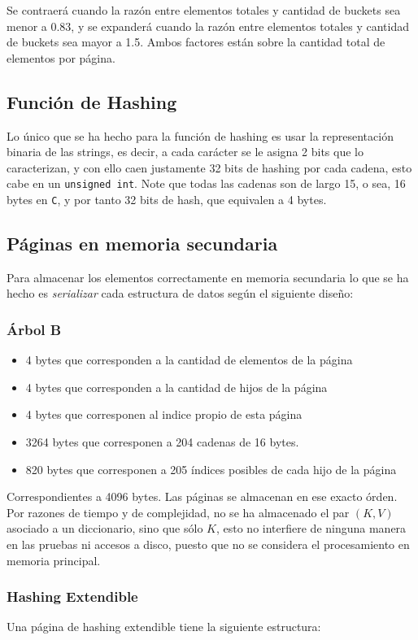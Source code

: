 \documentclass[12pt,letterpaper]{report}
\begin{document}
Se contraerá cuando la razón entre elementos totales y cantidad de buckets sea menor a 0.83, y se expanderá cuando la razón entre elementos totales y cantidad de buckets sea mayor a 1.5. Ambos factores están sobre la cantidad total de elementos por página.

\subsection{Función de Hashing}
Lo único que se ha hecho para la función de hashing es usar la representación binaria de las strings, es decir, a cada carácter se le asigna 2 bits que lo caracterizan, y con ello caen justamente 32 bits de hashing por cada cadena, esto cabe en un \texttt{unsigned int}. Note que todas las cadenas son de largo 15, o sea, 16 bytes en \texttt{C}, y por tanto 32 bits de hash, que equivalen a 4 bytes.

\subsection{Páginas en memoria secundaria}
Para almacenar los elementos correctamente en memoria secundaria lo que se ha hecho es \emph{serializar} cada estructura de datos según el siguiente diseño:

\subsubsection{Árbol B}
\begin{itemize}
\item 4 bytes que corresponden a la cantidad de elementos de la página
\item 4 bytes que corresponden a la cantidad de hijos de la página
\item 4 bytes que corresponen al indice propio de esta página
\item 3264 bytes que corresponen a 204 cadenas de 16 bytes.
\item 820 bytes que corresponen a 205 índices posibles de cada hijo de la página
\end{itemize}

Correspondientes a 4096 bytes. Las páginas se almacenan en ese exacto órden. Por razones de tiempo y de complejidad, no se ha almacenado el par $(K,V)$ asociado a un diccionario, sino que sólo $K$, esto no interfiere de ninguna manera en las pruebas ni accesos a disco, puesto que no se considera el procesamiento en memoria principal.

\subsubsection{Hashing Extendible}
Una página de hashing extendible tiene la siguiente estructura:
\end{document}
